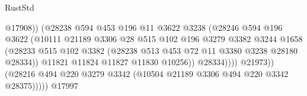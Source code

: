 \begin{lexlean}{RustStd}
\begin{coremodule}
{\begin{coremodule}
{{{{{{{{{{{{{{{{{{{{{{{{{{                                              @17908))
                                          (@28238
                                            @594
                                            @453
                                            @196
                                            @11
                                            @3622
                                            @3238
                                            (@28246
                                              @594
                                              @196
                                              @3622
                                              (@10111
                                                @21189
                                                @3306
                                                @28
                                                @515
                                                @102
                                                @196
                                                @3279
                                                @3382
                                                @3244
                                                @1658
                                                (@28233
                                                  @515
                                                  @102
                                                  @3382
                                                  (@28238
                                                    @513
                                                    @453
                                                    @72
                                                    @11
                                                    @3380
                                                    @3238
                                                    @28180
                                                    @28334))
                                                @11821
                                                @11824
                                                @11827
                                                @11830
                                                @10256))
                                            @28334))))
                                    @21973))
                                (@28216
                                  @494
                                  @220
                                  @3279
                                  @3342
                                  (@10504 @21189 @3306 @494 @220 @3342 @28375)))))
                          @17997
}}}}}}}}}}}}}}}}}}}}}}}}}}
\end{coremodule}}
\end{coremodule}
\end{lexlean}
